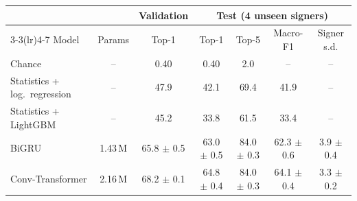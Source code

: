 \begin{tabular}{lcccccc}
\toprule
 & & \multicolumn{1}{c}{Validation} & \multicolumn{4}{c}{Test (4 unseen signers)} \\
\cmidrule(lr){3-3}\cmidrule(lr){4-7}
Model & Params & Top-1 & Top-1 & Top-5 & Macro-F1 & Signer s.d. \\
\midrule
Chance & -- & 0.40 & 0.40 & 2.0 & -- & -- \\
Statistics + log.\ regression & -- & 47.9 & 42.1 & 69.4 & 41.9 & -- \\
Statistics + LightGBM & -- & 45.2 & 33.8 & 61.5 & 33.4 & -- \\
\midrule
BiGRU & 1.43\,M & 65.8 $\pm$ 0.5 & 63.0 $\pm$ 0.5 & 84.0 $\pm$ 0.3 & 62.3 $\pm$ 0.6 & 3.9 $\pm$ 0.4 \\
Conv-Transformer & 2.16\,M & 68.2 $\pm$ 0.1 & 64.8 $\pm$ 0.4 & 84.0 $\pm$ 0.3 & 64.1 $\pm$ 0.4 & 3.3 $\pm$ 0.2 \\
\bottomrule
\end{tabular}
